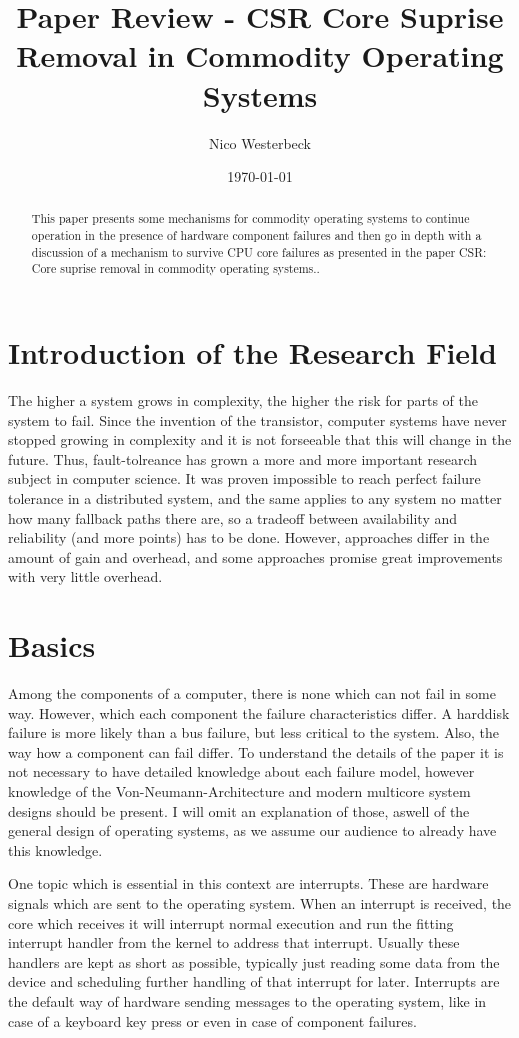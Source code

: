 \documentclass[a4paper,10pt,twoside]{article}
\title{Paper Review - CSR Core Suprise Removal in Commodity Operating Systems}
\author{Nico Westerbeck}
\date{\today}
\begin{document}
\maketitle

\begin{abstract}
This paper presents some mechanisms for commodity operating systems to continue operation in the presence of hardware component failures and then go in depth with a discussion of a mechanism to survive CPU core failures as presented in the paper CSR: Core suprise removal in commodity operating systems..
\end{abstract}

\tableofcontents

\section{Introduction of the Research Field}
The higher a system grows in complexity, the higher the risk for parts of the system to fail. Since the invention of the transistor, computer systems have never stopped growing in complexity and it is not forseeable that this will change in the future. Thus, fault-tolreance has grown a more and more important research subject in computer science. It was proven impossible \cite{FLPImpossibility} to reach perfect failure tolerance in a distributed system, and the same applies to any system no matter how many fallback paths there are, so a tradeoff between availability and reliability (and more points) has to be done. However, approaches differ in the amount of gain and overhead, and some approaches promise great improvements with very little overhead.

\section{Basics}
Among the components of a computer, there is none which can not fail in some way. However, which each component the failure characteristics differ. A harddisk failure is more likely than a bus failure, but less critical to the system. Also, the way how a component can fail differ. To understand the details of the paper it is not necessary to have detailed knowledge about each failure model, however knowledge of the Von-Neumann-Architecture and modern multicore system designs should be present. I will omit an explanation of those, aswell of the general design of operating systems, as we assume our audience to already have this knowledge.

One topic which is essential in this context are interrupts. These are hardware signals which are sent to the operating system. When an interrupt is received, the core which receives it will interrupt normal execution and run the fitting interrupt handler from the kernel to address that interrupt. Usually these handlers are kept as short as possible, typically just reading some data from the device and scheduling further handling of that interrupt for later. Interrupts are the default way of hardware sending messages to the operating system, like in case of a keyboard key press or even in case of component failures.
\end{document}

